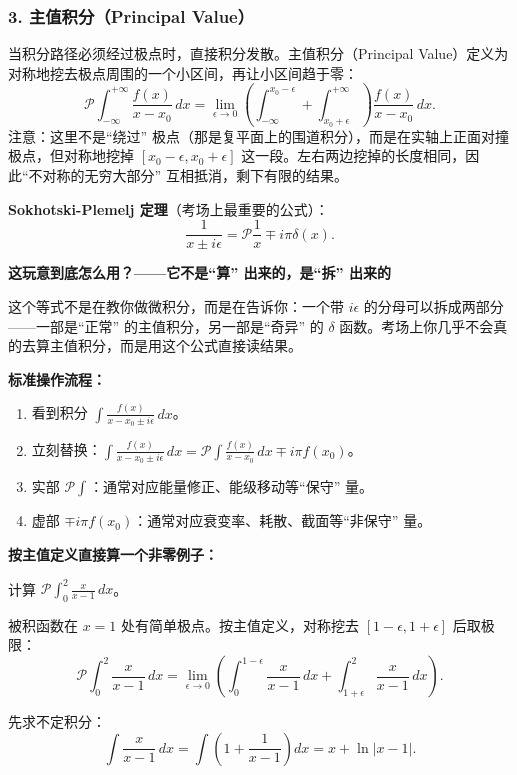\begin{derivationbox}
\subsubsection*{3. 主值积分（Principal Value）}

当积分路径必须经过极点时，直接积分发散。主值积分（Principal Value）定义为对称地挖去极点周围的一个小区间，再让小区间趋于零：
\[
\mathcal{P}\int_{-\infty}^{+\infty} \frac{f(x)}{x-x_0}\, dx = \lim_{\epsilon\to 0} \left( \int_{-\infty}^{x_0-\epsilon} + \int_{x_0+\epsilon}^{+\infty} \right) \frac{f(x)}{x-x_0}\, dx.
\]
注意：这里不是``绕过'' 极点（那是复平面上的围道积分），而是在实轴上正面对撞极点，但对称地挖掉 $[x_0 - \epsilon, x_0 + \epsilon]$ 这一段。左右两边挖掉的长度相同，因此``不对称的无穷大部分'' 互相抵消，剩下有限的结果。

\textbf{Sokhotski-Plemelj 定理}（考场上最重要的公式）：
\[
\frac{1}{x \pm i\epsilon} = \mathcal{P}\frac{1}{x} \mp i\pi\delta(x).
\]

\textbf{这玩意到底怎么用？——它不是``算'' 出来的，是``拆'' 出来的}

这个等式不是在教你做微积分，而是在告诉你：一个带 $i\epsilon$ 的分母可以拆成两部分——一部是``正常'' 的主值积分，另一部是``奇异'' 的 $\delta$ 函数。考场上你几乎不会真的去算主值积分，而是用这个公式直接读结果。

\textbf{标准操作流程：}
\begin{enumerate}
    \item 看到积分 $\displaystyle\int \frac{f(x)}{x - x_0 \pm i\epsilon}\, dx$。
    \item 立刻替换：$\displaystyle\int \frac{f(x)}{x - x_0 \pm i\epsilon}\, dx = \mathcal{P}\int \frac{f(x)}{x - x_0}\, dx \mp i\pi f(x_0)$。
    \item 实部 $\mathcal{P}\int$：通常对应能量修正、能级移动等``保守'' 量。
    \item 虚部 $\mp i\pi f(x_0)$：通常对应衰变率、耗散、截面等``非保守'' 量。
\end{enumerate}

\textbf{按主值定义直接算一个非零例子：}

计算 $\displaystyle\mathcal{P}\int_0^2 \frac{x}{x-1}\, dx$。

被积函数在 $x = 1$ 处有简单极点。按主值定义，对称挖去 $[1-\epsilon, 1+\epsilon]$ 后取极限：
\[
\mathcal{P}\int_0^2 \frac{x}{x-1}\, dx = \lim_{\epsilon\to 0} \left( \int_0^{1-\epsilon} \frac{x}{x-1}\, dx + \int_{1+\epsilon}^2 \frac{x}{x-1}\, dx \right).
\]

先求不定积分：
\[
\int \frac{x}{x-1}\, dx = \int \left( 1 + \frac{1}{x-1} \right) dx = x + \ln|x-1|.
\]


\end{derivationbox}
